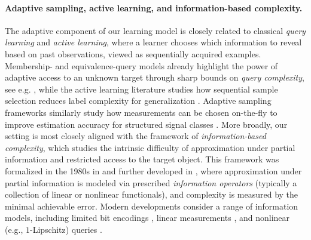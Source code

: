 \documentclass{article}
\begin{document}
\paragraph{Adaptive sampling, active learning, and information-based complexity.}
The adaptive %
component of our learning model is closely related to classical \emph{query learning} and \emph{active learning}, where a learner chooses which information to reveal %
based on past observations, viewed as sequentially acquired examples.
Membership- and equivalence-query models already highlight the power of adaptive access to an unknown target through sharp bounds on \emph{query complexity}, see e.g. \cite{angluin1987}, while the active learning literature studies how %
sequential sample selection reduces label complexity for generalization \cite{cohn1994,dasgupta2011}. 
Adaptive sampling frameworks similarly study how measurements can be chosen on-the-fly to improve estimation accuracy for structured signal classes \cite{castro2009active, sung1994active}.
More broadly, %
our setting is most closely aligned with the framework of \emph{information-based complexity}, which studies the
intrinsic difficulty of approximation %
under partial information and restricted
access to the target object. %
This framework was formalized in the 1980s in \cite{packel1987ibc, traub1988ibc} and further developed in \cite{novak2008tractability}, where approximation under partial information is modeled via prescribed \emph{information operators} (typically a collection of linear or nonlinear functionals), and complexity is measured by the minimal achievable error.
Modern developments consider a range of information models, including limited bit encodings \cite{kolmogorov1959varepsilon}, linear measurements \cite{pinkus2012n, krieg2021function, adcock2025optimal}, and nonlinear (e.g., $1$-Lipschitz) queries \cite{cohen2022optimal}.
\end{document}
